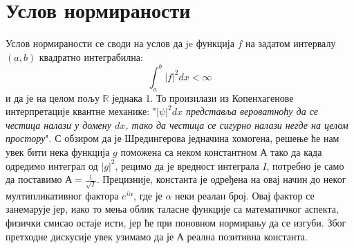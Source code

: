 \documentclass{tufte-handout} %
\theoremstyle{definition}
\theoremstyle{remark}
\newcommand{\R}{\mathbb{R}}
\begin{document}
\section{Услов нормираности}\label{sec:uslov_normiranosti}
Услов нормираности се своди на услов да je функција $f$ на задатом интервалу $(a,b)$ квадратно интеграбилна: \begin{equation*}
	\int_{a}^{b}|f|^2dx<\infty
\end{equation*}
и да је на целом пољу $\R$ једнака 1. То произилази из Копенхагенове интерпретације квантне механике: "\textit{$|\psi|^2dx$ представља вероватноћу да се честица налази у домену $dx$, тако да честица се сигурно налази негде на целом простору}". 
С обзиром да је Шредингерова једначина хомогена, решење ће нам увек бити нека функција $g$ поможена са неком константном $А$ тако да када одредимо интеграл од $|g|^2$, рецимо да је вредност интеграла $I$, потребно је само да поставимо $А=\frac{1}{\sqrt{I}}$. Прецизније, константа је одређена на овај начин до неког мултипликативног фактора $e^{i\alpha}$, где је $\alpha$ неки реалан број. Овај фактор се занемарује јер, иако то мења облик таласне функције са математичког аспекта, физички смисао остаје исти, јер ће при поновном нормирању да се изгуби. Због претходне дискусије увек узимамо да је $А$ реална позитивна константа.
\end{document}
